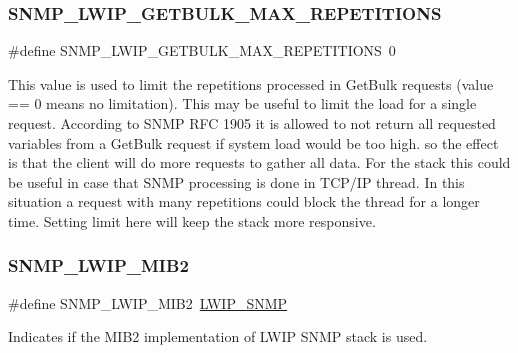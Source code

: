 \subsubsection{\texorpdfstring{S\+N\+M\+P\+\_\+\+L\+W\+I\+P\+\_\+\+G\+E\+T\+B\+U\+L\+K\+\_\+\+M\+A\+X\+\_\+\+R\+E\+P\+E\+T\+I\+T\+I\+O\+NS}{SNMP\_LWIP\_GETBULK\_MAX\_REPETITIONS}\hspace{0.1cm}{\footnotesize\ttfamily [2/2]}}
{\footnotesize\ttfamily \#define S\+N\+M\+P\+\_\+\+L\+W\+I\+P\+\_\+\+G\+E\+T\+B\+U\+L\+K\+\_\+\+M\+A\+X\+\_\+\+R\+E\+P\+E\+T\+I\+T\+I\+O\+NS~0}

This value is used to limit the repetitions processed in Get\+Bulk requests (value == 0 means no limitation). This may be useful to limit the load for a single request. According to S\+N\+MP R\+FC 1905 it is allowed to not return all requested variables from a Get\+Bulk request if system load would be too high. so the effect is that the client will do more requests to gather all data. For the stack this could be useful in case that S\+N\+MP processing is done in T\+C\+P/\+IP thread. In this situation a request with many repetitions could block the thread for a longer time. Setting limit here will keep the stack more responsive. \mbox{\label{group__snmp__opts_gaab667d48f48ee89f8bdbc7f134e6037d}} 
\subsubsection{\texorpdfstring{S\+N\+M\+P\+\_\+\+L\+W\+I\+P\+\_\+\+M\+I\+B2}{SNMP\_LWIP\_MIB2}\hspace{0.1cm}{\footnotesize\ttfamily [1/2]}}
{\footnotesize\ttfamily \#define S\+N\+M\+P\+\_\+\+L\+W\+I\+P\+\_\+\+M\+I\+B2~\hyperlink{group__snmp__opts_gaf4900859dc53f19f5f67cc34e48ad68c}{L\+W\+I\+P\+\_\+\+S\+N\+MP}}

Indicates if the M\+I\+B2 implementation of L\+W\+IP S\+N\+MP stack is used. \mbox{\label{group__snmp__opts_gaab667d48f48ee89f8bdbc7f134e6037d}} 
